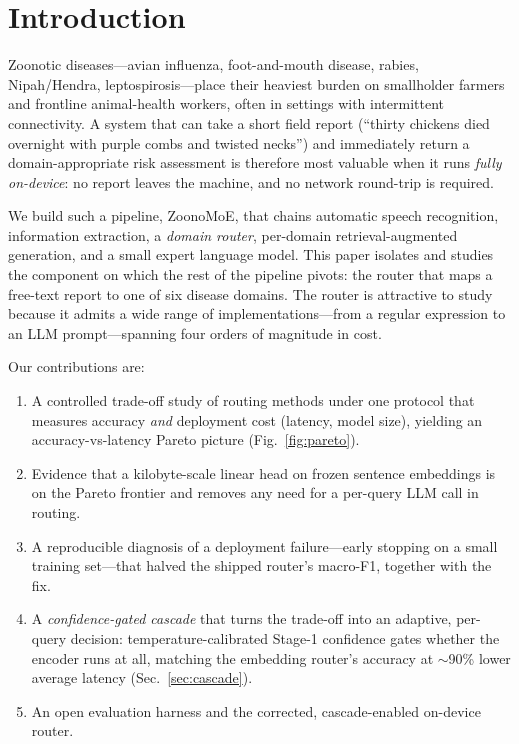\documentclass[runningheads]{llncs}
\begin{document}
\section{Introduction}
Zoonotic diseases---avian influenza, foot-and-mouth disease, rabies, Nipah/Hendra,
leptospirosis---place their heaviest burden on smallholder farmers and frontline
animal-health workers, often in settings with intermittent connectivity. A system
that can take a short field report (``thirty chickens died overnight with purple
combs and twisted necks'') and immediately return a domain-appropriate risk
assessment is therefore most valuable when it runs \emph{fully on-device}: no
report leaves the machine, and no network round-trip is required.

We build such a pipeline, ZoonoMoE, that chains automatic speech recognition,
information extraction, a \emph{domain router}, per-domain retrieval-augmented
generation, and a small expert language model. This paper isolates and studies
the component on which the rest of the pipeline pivots: the router that maps a
free-text report to one of six disease domains. The router is attractive to study
because it admits a wide range of implementations---from a regular expression to
an LLM prompt---spanning four orders of magnitude in cost.

Our contributions are:
\begin{enumerate}
\item A controlled trade-off study of routing methods under one protocol
that measures accuracy \emph{and} deployment cost (latency, model size), yielding
an accuracy-vs-latency Pareto picture (Fig.~\ref{fig:pareto}).
\item Evidence that a kilobyte-scale linear head on frozen sentence embeddings is
on the Pareto frontier and removes any need for a per-query LLM call in routing.
\item A reproducible diagnosis of a deployment failure---early stopping on a small
training set---that halved the shipped router's macro-F1, together with the fix.
\item A \emph{confidence-gated cascade} that turns the trade-off into an adaptive,
per-query decision: temperature-calibrated Stage-1 confidence gates whether the
encoder runs at all, matching the embedding router's accuracy at $\sim$90\% lower
average latency (Sec.~\ref{sec:cascade}).
\item An open evaluation harness and the corrected, cascade-enabled on-device router.
\end{enumerate}
\end{document}
